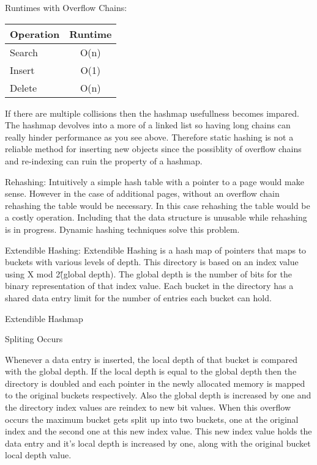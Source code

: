 \documentclass[letterpaper, 12pt]{article}
\begin{document}
\par\vspace{\baselineskip}

Runtimes with Overflow Chains:
\begin{tabular}{l | c}
  Operation & Runtime \\ \hline \hline
  Search & O(n) \\ \hline
  Insert & O(1) \\ \hline
  Delete & O(n) \\ \hline
\end{tabular}

If there are multiple collisions then the hashmap usefullness becomes impared. The hashmap devolves into a more
of a linked list so having long chains can really hinder performance as you see above. Therefore static hashing
is not a reliable method for inserting new objects since the possiblity of overflow chains and re-indexing can
ruin the property of a hashmap.

Rehashing:
Intuitively a simple hash table with a pointer to a page would make sense. However in the case of 
additional pages, without an overflow chain rehashing the table would be necessary. In this 
case rehashing the table would be a costly operation. Including that the data structure is unusable 
while rehashing is in progress. Dynamic hashing techniques solve this problem.

Extendible Hashing:
Extendible Hashing is a hash map of pointers that maps to buckets with various levels of depth. This directory 
is based on an index value using X mod 2\^(global depth). The global depth is the number of bits for the binary
representation of that index value. Each bucket in the directory has a shared data entry limit for the number of 
entries each bucket can hold.

Extendible Hashmap

Spliting Occurs

Whenever a data entry is inserted, the local depth of that bucket is compared with the global depth. If the local depth
is equal to the global depth then the directory is doubled and each pointer in the newly allocated memory is mapped to the
original buckets respectively. Also the global depth is increased by one and the directory index values are reindex to new
bit values. When this overflow occurs the maximum bucket gets split up into two buckets, one at the original index and the 
second one at this new index value. This new index value holds the data entry and it's local depth is increased by one, along with
the original bucket local depth value.
\end{document}
